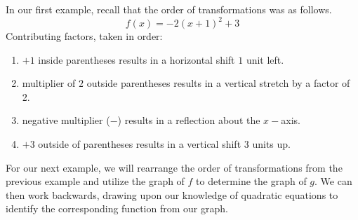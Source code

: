 \documentclass[12pt]{book}
\theoremstyle{definition}
\begin{document}
In our first example, recall that the order of transformations was as follows.
$$f(x)=-2(x+1)^2+3$$
Contributing factors, taken in order:
\begin{enumerate}
	\item $+1$ inside parentheses results in a horizontal shift $1$ unit left.
	\item multiplier of $2$ outside parentheses results in a vertical stretch by a factor of 2.
	\item negative multiplier ($-$) results in a reflection about the $x-$axis.
	\item $+3$ outside of parentheses results in a vertical shift $3$ units up.
\end{enumerate}
For our next example, we will rearrange the order of transformations from the previous example and utilize the graph of $f$ to determine the graph of $g$.  We can then work backwards, drawing upon our knowledge of quadratic equations to identify the corresponding function from our graph.
\newpage
\end{document}
